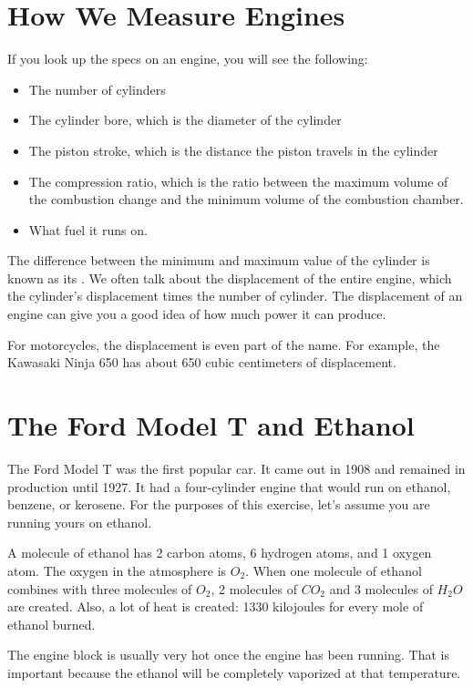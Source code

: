 \section{How We Measure Engines}

If you look up the specs on an engine,  you will see the following:

\begin{itemize}
\item The number of cylinders
\item The cylinder bore, which is the diameter of the cylinder
\item The piston stroke,  which is the distance the piston travels in the cylinder
\item The compression ratio,  which is the ratio between the maximum volume of the combustion change and the minimum volume of the combustion chamber.
\item What fuel it runs on.
\end{itemize}

The difference between the minimum and maximum value of the cylinder is known as its .   We often talk about the displacement of the entire engine, which the
 cylinder's displacement times the number of cylinder.  The displacement of an engine can give you a
 good idea of how much power it can produce.
 
For motorcycles,  the displacement is even part of the name.   For example,  the Kawasaki Ninja 650 has about 650 cubic centimeters of displacement.  

\section{The Ford Model T and Ethanol}

The Ford Model T was the first popular car.   It came out in 1908 and remained in production until 1927.  It had a four-cylinder engine that would run on ethanol, benzene, or kerosene.  For the purposes of this exercise, let's assume you are running yours on ethanol.

A molecule of ethanol has 2 carbon atoms, 6 hydrogen atoms, and 1 oxygen atom.  The oxygen in the atmosphere is $O_2$.   When one molecule of ethanol combines with three molecules of $O_2$,  2 molecules of $CO_2$ and 3 molecules of $H_2O$ are created.  Also, a lot of heat is created: 1330 kilojoules for every mole of ethanol burned.

The engine block is usually very hot once the engine has been running.  That is important because the ethanol will be completely vaporized at that temperature.

